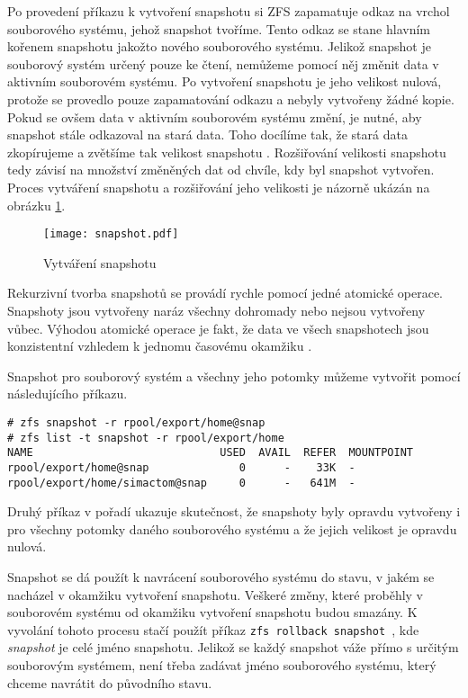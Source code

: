 Po provedení příkazu k vytvoření snapshotu si ZFS zapamatuje odkaz na vrchol souborového systému, jehož snapshot tvoříme. Tento odkaz se stane hlavním kořenem snapshotu jakožto nového souborového systému. Jelikož snapshot je souborový systém určený pouze ke čtení, nemůžeme pomocí něj změnit data v aktivním souborovém systému. Po vytvoření snapshotu je jeho velikost nulová, protože se provedlo pouze zapamatování odkazu a nebyly vytvořeny žádné kopie. Pokud se ovšem data v aktivním souborovém systému změní, je nutné, aby snapshot stále odkazoval na stará data. Toho docílíme tak, že stará data zkopírujeme a zvětšíme tak velikost snapshotu \cite{snapshot}. Rozšiřování velikosti snapshotu tedy závisí na množství změněných dat od chvíle, kdy byl snapshot vytvořen. Proces vytváření snapshotu a rozšiřování jeho velikosti je názorně ukázán na obrázku \ref{snapshotproces}.
\begin{figure}[h]
    \caption{Vytváření snapshotu}
    \label{snapshotproces}
    \texttt{[image: snapshot.pdf]}
\end{figure}

Rekurzivní tvorba snapshotů se provádí rychle pomocí jedné atomické operace. Snapshoty jsou vytvořeny naráz všechny dohromady nebo nejsou vytvořeny vůbec. Výhodou atomické operace je fakt, že data ve všech snapshotech jsou konzistentní vzhledem k jednomu časovému okamžiku \cite{snapshot}.

Snapshot pro souborový systém a všechny jeho potomky můžeme vytvořit pomocí následujícího příkazu.
\begin{verbatim}
# zfs snapshot -r rpool/export/home@snap
# zfs list -t snapshot -r rpool/export/home
NAME                             USED  AVAIL  REFER  MOUNTPOINT
rpool/export/home@snap              0      -    33K  -
rpool/export/home/simactom@snap     0      -   641M  -
\end{verbatim}
Druhý příkaz v pořadí ukazuje skutečnost, že snapshoty byly opravdu vytvořeny i pro všechny potomky daného souborového systému a že jejich velikost je opravdu nulová.

Snapshot se dá použít k navrácení souborového systému do stavu, v jakém se nacházel v okamžiku vytvoření snapshotu. Veškeré změny, které proběhly v souborovém systému od okamžiku vytvoření snapshotu budou smazány. K vyvolání tohoto procesu stačí použít příkaz \verb|zfs rollback snapshot |, kde \emph{snapshot} je celé jméno snapshotu. Jelikož se každý snapshot váže přímo s určitým souborovým systémem, není třeba zadávat jméno souborového systému, který chceme navrátit do původního stavu. 